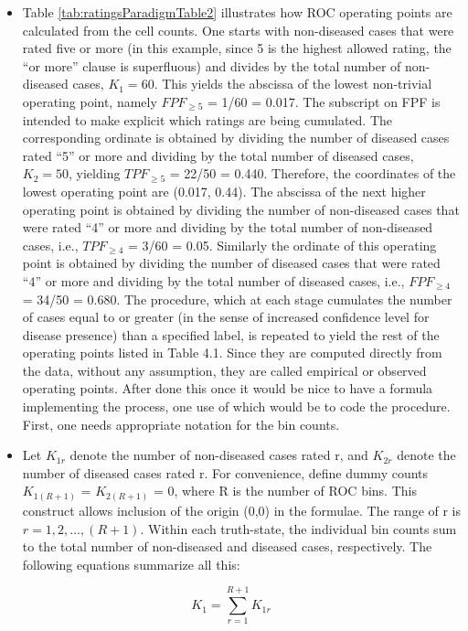 \documentclass[
]{book}
\begin{document}
\begin{itemize}
\item
  Table \ref{tab:ratingsParadigmTable2} illustrates how ROC operating points are calculated from the cell counts. One starts with non-diseased cases that were rated five or more (in this example, since 5 is the highest allowed rating, the ``or more'' clause is superfluous) and divides by the total number of non-diseased cases, \(K_1 = 60\). This yields the abscissa of the lowest non-trivial operating point, namely \(FPF_{\ge5}\) = 1/60 = 0.017. The subscript on FPF is intended to make explicit which ratings are being cumulated. The corresponding ordinate is obtained by dividing the number of diseased cases rated ``5'' or more and dividing by the total number of diseased cases, \(K_2 = 50\), yielding \(TPF_{\ge5}\) = 22/50 = 0.440. Therefore, the coordinates of the lowest operating point are (0.017, 0.44). The abscissa of the next higher operating point is obtained by dividing the number of non-diseased cases that were rated ``4'' or more and dividing by the total number of non-diseased cases, i.e., \(TPF_{\ge4}\) = 3/60 = 0.05. Similarly the ordinate of this operating point is obtained by dividing the number of diseased cases that were rated ``4'' or more and dividing by the total number of diseased cases, i.e., \(FPF_{\ge4}\) = 34/50 = 0.680. The procedure, which at each stage cumulates the number of cases equal to or greater (in the sense of increased confidence level for disease presence) than a specified label, is repeated to yield the rest of the operating points listed in Table 4.1. Since they are computed directly from the data, without any assumption, they are called empirical or observed operating points. After done this once it would be nice to have a formula implementing the process, one use of which would be to code the procedure. First, one needs appropriate notation for the bin counts.
\item
  Let \(K_{1r}\) denote the number of non-diseased cases rated r, and \(K_{2r}\) denote the number of diseased cases rated r. For convenience, define dummy counts \(K_{1{(R+1)}}\) = \(K_{2{(R+1)}}\) = 0, where R is the number of ROC bins. This construct allows inclusion of the origin (0,0) in the formulae. The range of r is \(r = 1,2,...,(R+1)\). Within each truth-state, the individual bin counts sum to the total number of non-diseased and diseased cases, respectively. The following equations summarize all this:
\end{itemize}

\begin{equation*} 
K_1=\sum_{r=1}^{R+1}K_{1r}
\end{equation*}
\end{document}
